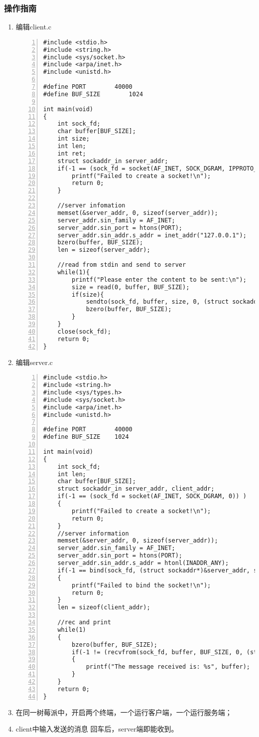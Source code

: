\documentclass{article}
\begin{document}
\subsubsection{操作指南}
\begin{enumerate}

	\item 编辑client.c
\begin{lstlisting}[numbers=left]
#include <stdio.h>
#include <string.h>
#include <sys/socket.h>
#include <arpa/inet.h>
#include <unistd.h>

#define PORT		40000
#define BUF_SIZE        1024

int main(void)
{
	int sock_fd;
	char buffer[BUF_SIZE];
	int size;
	int len;
	int ret;
	struct sockaddr_in server_addr;
	if(-1 == (sock_fd = socket(AF_INET, SOCK_DGRAM, IPPROTO_IP)) ){
		printf("Failed to create a socket!\n");
		return 0;
	}

	//server infomation
	memset(&server_addr, 0, sizeof(server_addr));
	server_addr.sin_family = AF_INET;
	server_addr.sin_port = htons(PORT);
	server_addr.sin_addr.s_addr = inet_addr("127.0.0.1");
	bzero(buffer, BUF_SIZE);
	len = sizeof(server_addr);

	//read from stdin and send to server
	while(1){
		printf("Please enter the content to be sent:\n");
		size = read(0, buffer, BUF_SIZE);
		if(size){
			sendto(sock_fd, buffer, size, 0, (struct sockaddr*)&server_addr, len);
			bzero(buffer, BUF_SIZE);
		}
	}
	close(sock_fd);
	return 0;
}

\end{lstlisting}
    \item 编辑server.c
\begin{lstlisting}[numbers=left]
#include <stdio.h>
#include <string.h>
#include <sys/types.h>
#include <sys/socket.h>
#include <arpa/inet.h>
#include <unistd.h>

#define	PORT		40000
#define	BUF_SIZE	1024

int main(void)
{
	int sock_fd;
	int len;
	char buffer[BUF_SIZE];
	struct sockaddr_in server_addr, client_addr;
	if(-1 == (sock_fd = socket(AF_INET, SOCK_DGRAM, 0)) )
	{
		printf("Failed to create a socket!\n");
		return 0;
	}
	//server information
	memset(&server_addr, 0, sizeof(server_addr));
	server_addr.sin_family = AF_INET;
	server_addr.sin_port = htons(PORT);
	server_addr.sin_addr.s_addr = htonl(INADDR_ANY);
	if(-1 == bind(sock_fd, (struct sockaddr*)&server_addr, sizeof(server_addr)))
	{
		printf("Failed to bind the socket!\n");
		return 0;
	}
	len = sizeof(client_addr);
	
	//rec and print
	while(1)
	{
		bzero(buffer, BUF_SIZE);
		if(-1 != (recvfrom(sock_fd, buffer, BUF_SIZE, 0, (struct sockaddr*)&client_addr, &len)) )
		{
			printf("The message received is: %s", buffer);
		}
	}
	return 0;
}

\end{lstlisting}
    \item 在同一树莓派中，开启两个终端，一个运行客户端，一个运行服务端；
    \item client中输入发送的消息 回车后，server端即能收到。
\end{enumerate}
\end{document}
